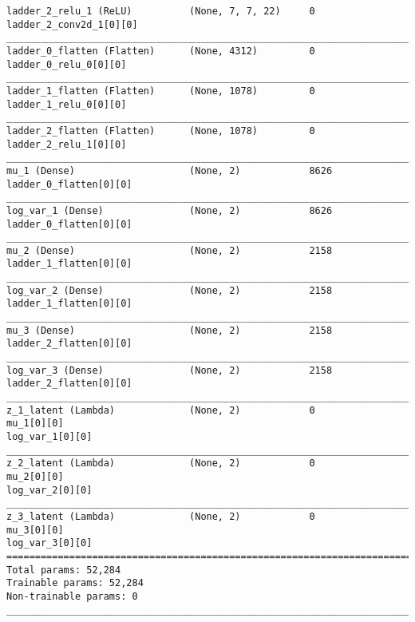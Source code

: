 \begin{lstlisting}[caption={\textsc{Mnist}-VLAE-factor-3 Encoder},captionpos=b,basicstyle=\tiny, label={lst:sparsity-vlae-encoder-28-fm3}]
ladder_2_relu_1 (ReLU)          (None, 7, 7, 22)     0           ladder_2_conv2d_1[0][0]
__________________________________________________________________________________________________
ladder_0_flatten (Flatten)      (None, 4312)         0           ladder_0_relu_0[0][0]
__________________________________________________________________________________________________
ladder_1_flatten (Flatten)      (None, 1078)         0           ladder_1_relu_0[0][0]
__________________________________________________________________________________________________
ladder_2_flatten (Flatten)      (None, 1078)         0           ladder_2_relu_1[0][0]
__________________________________________________________________________________________________
mu_1 (Dense)                    (None, 2)            8626        ladder_0_flatten[0][0]
__________________________________________________________________________________________________
log_var_1 (Dense)               (None, 2)            8626        ladder_0_flatten[0][0]
__________________________________________________________________________________________________
mu_2 (Dense)                    (None, 2)            2158        ladder_1_flatten[0][0]
__________________________________________________________________________________________________
log_var_2 (Dense)               (None, 2)            2158        ladder_1_flatten[0][0]
__________________________________________________________________________________________________
mu_3 (Dense)                    (None, 2)            2158        ladder_2_flatten[0][0]
__________________________________________________________________________________________________
log_var_3 (Dense)               (None, 2)            2158        ladder_2_flatten[0][0]
__________________________________________________________________________________________________
z_1_latent (Lambda)             (None, 2)            0           mu_1[0][0]
log_var_1[0][0]
__________________________________________________________________________________________________
z_2_latent (Lambda)             (None, 2)            0           mu_2[0][0]
log_var_2[0][0]
__________________________________________________________________________________________________
z_3_latent (Lambda)             (None, 2)            0           mu_3[0][0]
log_var_3[0][0]
==================================================================================================
Total params: 52,284
Trainable params: 52,284
Non-trainable params: 0
__________________________________________________________________________________________________
\end{lstlisting}